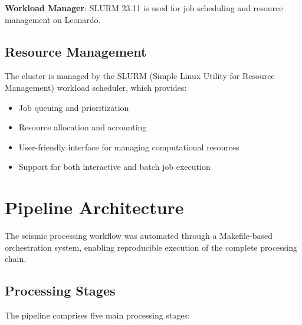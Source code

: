 \textbf{Workload Manager}: SLURM 23.11 is used for job scheduling and resource
management on Leonardo.

\subsection{Resource Management}
The cluster is managed by the SLURM (Simple Linux Utility for Resource
Management) workload scheduler, which provides:

\begin{itemize}
  \item Job queuing and prioritization
  \item Resource allocation and accounting
  \item User-friendly interface for managing computational resources
  \item Support for both interactive and batch job execution
\end{itemize}

\section{Pipeline Architecture}

The seismic processing workflow was automated through a Makefile-based
orchestration system, enabling reproducible execution of the complete
processing chain.

\subsection{Processing Stages}
The pipeline comprises five main processing stages:


